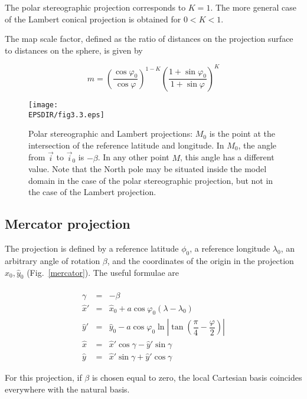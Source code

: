 The polar stereographic projection corresponds to $K=1$. The more general case
of the Lambert conical projection is obtained for $0<K<1$.

The map scale factor, defined as the ratio of distances on the projection
surface to distances on the sphere, is given by

\begin{equation}
m=\left( \dfrac{\cos \varphi _{0}}{\cos \varphi}\right)^{1-K}
\left( \dfrac{1 + \sin\varphi _{0}}{1 + \sin\varphi} \right)^{K}
\end{equation}

\begin{figure}[!ht]
\centerline{\texttt{[image: \\EPSDIR/fig3.3.eps]}}
\caption{Polar stereographic and Lambert projections: $M_0$ is the point
at the intersection of the reference latitude and longitude. In $M_0$, the
angle from $\vec{i}$ to $\vec{i}_0$ is $-\beta$. In any other point $M$,
this angle has a different value. Note that the North pole may be situated
inside the model domain in the case of the polar stereographic projection,
but not in the case of the Lambert projection.}
\label{polarstereo}
\end{figure}

\subsection{Mercator projection}

The projection is defined by a reference latitude $\phi_0$, a reference
longitude $\lambda_0$, an arbitrary angle of rotation $\beta$,
and the coordinates of the origin in the projection
$\widehat{x}_0, \widehat{y}_0$ (Fig.~\ref{mercator}). The useful formulae are

\begin{eqnarray}
\nonumber \\ \gamma & = & - \beta \nonumber \\
\widehat{x}' & = & \widehat{x}_0
+ a \cos \varphi _{0}(\lambda - \lambda _{0})  \nonumber \\
\widehat{y}' & = & \widehat{y}_0
 -a\cos\varphi _{0} \ln|\tan(\dfrac{\pi}{4}-\dfrac{\varphi}{2})|  \\
\widehat{x}  & = & \widehat{x}'\cos\gamma - \widehat{y}'\sin\gamma
\nonumber \\
\widehat{y}  & = & \widehat{x}'\sin\gamma + \widehat{y}'\cos\gamma
\nonumber
\end{eqnarray}

For this projection, if $\beta$ is chosen equal to zero, the local
Cartesian basis coincides everywhere with the natural basis.

